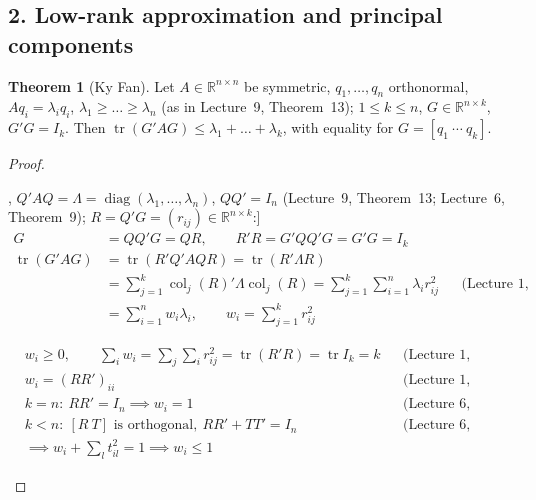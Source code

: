 \documentclass[12pt]{article}
\newcommand{\R}{\mathbb R}
\DeclareMathOperator{\tr}{tr}
\DeclareMathOperator{\col}{col}
\DeclareMathOperator{\diag}{diag}
\theoremstyle{definition}
\newtheorem{theorem}{Theorem}
\newcommand{\lec}[1]{Lecture~#1}
\newcommand{\boardtop}{\vspace*{-\abovedisplayskip}}
\begin{document}
\subsection*{2. Low-rank approximation and principal components}

\begin{theorem}[Ky Fan]\label{b9.27}
Let \(A\in\R^{n\times n}\) be symmetric, \(q_1,\dots,q_n\) orthonormal, \(Aq_i=\lambda_iq_i\),
\(\lambda_1\geqslant\dots\geqslant\lambda_n\) (as in \lec{9}, Theorem~13); \(1\leqslant k\leqslant n\), \(G\in\R^{n\times k}\),
\(G'G=I_k\). Then \(\tr(G'AG)\leqslant\lambda_1+\dots+\lambda_k\), with equality for \(G=[q_1\ \cdots\ q_k]\).
\end{theorem}
\begin{proof}
\begin{board}[\(Q=[q_1\ \cdots\ q_n]\), \(Q'AQ=\Lambda=\diag(\lambda_1,\dots,\lambda_n)\), \(QQ'=I_n\) (\lec{9},
Theorem~13; \lec{6}, Theorem~9); \(R=Q'G=(r_{ij})\in\R^{n\times k}\):]
\boardtop
\begin{align*}
G&=QQ'G=QR,\qquad R'R=G'QQ'G=G'G=I_k\\
\tr(G'AG)&=\tr(R'Q'AQR)=\tr(R'\Lambda R)\\
&=\textstyle\sum_{j=1}^k\col_j(R)'\Lambda\col_j(R)=\sum_{j=1}^k\sum_{i=1}^n\lambda_ir_{ij}^2
&&\text{(\lec{1}, Theorem~4(a),(d))}\\
&=\textstyle\sum_{i=1}^nw_i\lambda_i,\qquad w_i=\sum_{j=1}^kr_{ij}^2
\end{align*}
\end{board}
\begin{board}[\(0\leqslant w_i\leqslant1\), \(\sum_iw_i=k\):]
\boardtop
\begin{align*}
&w_i\geqslant0,\qquad\textstyle\sum_iw_i=\sum_j\sum_ir_{ij}^2=\tr(R'R)=\tr I_k=k&&\text{(\lec{1}, Theorem~10(c))}\\
&w_i=(RR')_{ii}&&\text{(\lec{1}, Theorem~4(d))}\\
&k=n\colon\ RR'=I_n\implies w_i=1&&\text{(\lec{6}, Theorem~9)}\\
&k<n\colon\ [R\ T]\text{ is orthogonal},\ RR'+TT'=I_n&&\text{(\lec{6}, Corollary~11(c))}\\
&\implies w_i+\textstyle\sum_lt_{il}^2=1\implies w_i\leqslant1
\end{align*}
\end{board}
\begin{board}

\end{board}
\end{proof}
\end{document}
